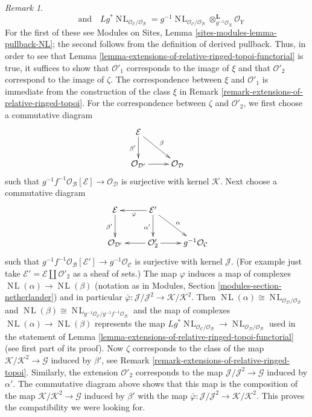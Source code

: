 \documentclass{stacks-project}
\theoremstyle{plain}
\theoremstyle{definition}
\theoremstyle{remark}
\newtheorem{remark}[subsection]{Remark}
\numberwithin{equation}{subsection}
\def\NL{\mathop{N\!L}\nolimits}
\begin{document}
\begin{remark}
$$\quad\text{and}\quad
Lg^*\NL_{\mathcal{O}_\mathcal{C}/\mathcal{O}_\mathcal{B}} =
g^{-1}\NL_{\mathcal{O}_\mathcal{C}/\mathcal{O}_\mathcal{B}}
\otimes_{g^{-1}\mathcal{O}_X}^\mathbf{L} \mathcal{O}_Y
$$
For the first of these see
Modules on Sites, Lemma \ref{sites-modules-lemma-pullback-NL}; the second
follows from the definition of derived pullback.
Thus, in order to see that
Lemma \ref{lemma-extensions-of-relative-ringed-topoi-functorial}
is true, it suffices to show that $\mathcal{O}'_1$ corresponds
to the image of $\xi$ and that $\mathcal{O}'_2$ correspond to
the image of $\zeta$.
The correspondence between $\xi$ and $\mathcal{O}'_1$
is immediate from the construction of the class $\xi$ in
Remark \ref{remark-extensions-of-relative-ringed-topoi}.
For the correspondence between $\zeta$ and $\mathcal{O}'_2$,
we first choose a commutative diagram
$$
\xymatrix{
\mathcal{E} \ar[d]_{\beta'} \ar[rd]^\beta \\
\mathcal{O}_{\mathcal{D}'} \ar[r] & \mathcal{O}_\mathcal{D}
}
$$
such that $g^{-1}f^{-1}\mathcal{O}_\mathcal{B}[\mathcal{E}] \to
\mathcal{O}_\mathcal{D}$
is surjective with kernel $\mathcal{K}$. Next choose a
commutative diagram
$$
\xymatrix{
\mathcal{E} \ar[d]_{\beta'} &
\mathcal{E}' \ar[l]^\varphi \ar[d]_{\alpha'} \ar[rd]^\alpha \\
\mathcal{O}_{\mathcal{D}'} &
\mathcal{O}'_2 \ar[l] \ar[r] &
g^{-1}\mathcal{O}_\mathcal{C}
}
$$
such that $g^{-1}f^{-1}\mathcal{O}_\mathcal{B}[\mathcal{E}'] \to
g^{-1}\mathcal{O}_\mathcal{C}$
is surjective with kernel $\mathcal{J}$. (For example just take
$\mathcal{E}' = \mathcal{E} \amalg \mathcal{O}'_2$ as a sheaf of sets.)
The map $\varphi$ induces a map of complexes $\NL(\alpha) \to \NL(\beta)$
(notation as in Modules, Section \ref{modules-section-netherlander})
and in particular
$\bar\varphi : \mathcal{J}/\mathcal{J}^2 \to \mathcal{K}/\mathcal{K}^2$.
Then $\NL(\alpha) \cong \NL_{\mathcal{O}_\mathcal{D}/\mathcal{O}_\mathcal{B}}$
and
$\NL(\beta) \cong
\NL_{g^{-1}\mathcal{O}_\mathcal{C}/g^{-1}f^{-1}\mathcal{O}_\mathcal{B}}$
and the map of complexes $\NL(\alpha) \to \NL(\beta)$
represents the map
$Lg^*\NL_{\mathcal{O}_\mathcal{C}/\mathcal{O}_\mathcal{B}} \to
\NL_{\mathcal{O}_\mathcal{D}/\mathcal{O}_\mathcal{B}}$
used in the
statement of Lemma \ref{lemma-extensions-of-relative-ringed-topoi-functorial}
(see first part of its proof). Now $\zeta$ corresponds to the
class of the map $\mathcal{K}/\mathcal{K}^2 \to \mathcal{G}$
induced by $\beta'$, see
Remark \ref{remark-extensions-of-relative-ringed-topoi}.
Similarly, the extension $\mathcal{O}'_2$ corresponds to the map
$\mathcal{J}/\mathcal{J}^2 \to \mathcal{G}$ induced by $\alpha'$.
The commutative diagram above shows that this map is
the composition of the map $\mathcal{K}/\mathcal{K}^2 \to \mathcal{G}$
induced by $\beta'$ with the map
$\bar\varphi : \mathcal{J}/\mathcal{J}^2 \to \mathcal{K}/\mathcal{K}^2$.
This proves the compatibility we were looking for.
\end{remark}
\end{document}
